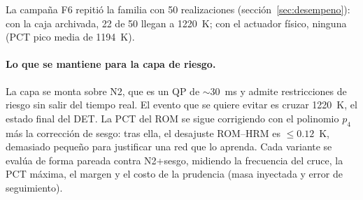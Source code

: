 \noindent La campaña F6 repitió la familia con 50 realizaciones (sección~\ref{sec:desempeno}):
con la caja archivada, 22 de 50 llegan a 1220~K; con el actuador físico, ninguna (PCT pico
media de 1194~K).


\paragraph{Lo que se mantiene para la capa de riesgo.} La capa se monta sobre N2, que es un QP
de $\sim30$~ms y admite restricciones de riesgo sin salir del tiempo real. El evento que se
quiere evitar es cruzar 1220~K, el estado final del DET. La PCT del ROM se sigue corrigiendo
con el polinomio $p_4$ más la corrección de sesgo: tras ella, el desajuste ROM--HRM es
$\le0.12$~K, demasiado pequeño para justificar una red que lo aprenda. Cada variante se evalúa
de forma pareada contra N2+sesgo, midiendo la frecuencia del cruce, la PCT máxima, el margen y
el costo de la prudencia (masa inyectada y error de seguimiento).
